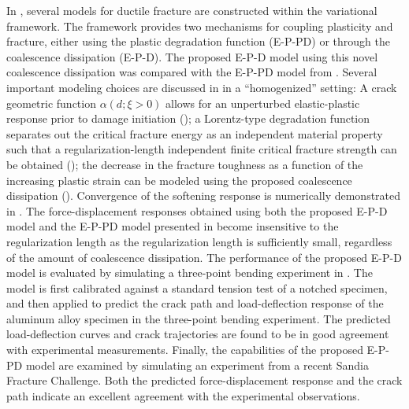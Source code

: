 In , several models for ductile fracture are constructed within the variational framework. The framework provides two mechanisms for coupling  plasticity and fracture, either using the plastic degradation function (E-P-PD) or through the coalescence dissipation (E-P-D). The proposed E-P-D model using this novel coalescence dissipation was compared with the E-P-PD model from \cite{brandon2020cohesive}.
Several important modeling choices are discussed in  in a ``homogenized'' setting:
A crack geometric function $\alpha(d; \xi > 0)$ allows for an unperturbed elastic-plastic response prior to damage initiation ();
a Lorentz-type degradation function separates out the critical fracture energy as an independent material property such that a regularization-length independent finite critical fracture strength can be obtained ();
the decrease in the fracture toughness as a function of the increasing plastic strain can be modeled using the proposed coalescence dissipation ().
Convergence of the softening response is numerically demonstrated in .
The force-displacement responses obtained using both the proposed E-P-D model and the E-P-PD model presented in \cite{brandon2020cohesive} become insensitive to the regularization length as the regularization length is sufficiently small, regardless of the amount of coalescence dissipation.
The performance of the proposed E-P-D model is evaluated by simulating a three-point bending experiment in . The model is first calibrated against a standard tension test of a notched specimen, and then applied to predict the crack path and load-deflection response of the aluminum alloy specimen in the three-point bending experiment.
The predicted load-deflection curves and crack trajectories are found to be in good agreement with experimental measurements. Finally, the capabilities of the proposed E-P-PD model are examined by simulating an experiment from a recent Sandia Fracture Challenge. Both the predicted force-displacement response and the crack path indicate an excellent agreement with the experimental observations.
